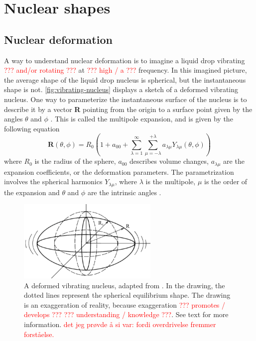 \documentclass[twoside,english]{uiofysmaster/uiofysmaster}
\let\orgautoref\autoref
\renewcommand{\autoref}
        {%
		 \def\sectionautorefname{Section}%
		 \def\subsectionautorefname{Section}%
		 \def\subsubsectionautorefname{Section}%
		 \def\chapterautorefname{Chapter}%
          \orgautoref}
\begin{document}
\section{Nuclear shapes}\label{sec:shapes}

\subsection{Nuclear deformation}
A way to understand nuclear deformation is to imagine a liquid drop vibrating \textcolor{red}{??? and/or rotating ???} at \textcolor{red}{??? high / a ???} frequency. 
In this imagined picture, the average shape of the liquid drop nucleus is spherical, but the instantaneous shape is not.
\autoref{fig:vibrating-nucleus} displays a sketch of a deformed vibrating nucleus.
One way to parameterize the instantaneous surface of the nucleus is to describe it by a vector \textbf{R} pointing from the origin to a surface point given by the angles $\theta$ and $\phi$ \cite{Krane}.
This is called the multipole expansion, and is given by the following equation
\begin{equation}\label{eq:Rfull}
	\mathbf{R}(\theta, \phi) = R_0 \left( 1 + a_{00} + \sum^\infty_{\lambda = 1} \sum^{+\lambda}_{\mu = -\lambda} a_{\lambda \mu} Y_{\lambda \mu}(\theta, \phi) \right)
\end{equation}
where $R_0$ is the radius of the sphere, $a_{00}$ describes volume changes, $a_{\lambda \mu}$ are the expansion coefficients, or the deformation parameters. 
The parametrization involves the spherical harmonics $Y_{\lambda \mu}$, where $\lambda$ is the multipole, $\mu$ is the order of the expansion and $\theta$ and $\phi$ are the intrinsic angles \cite{Krane, RS, Klintefjord}. 

\begin{figure}[ht]
	\centering
	\includegraphics[width=0.6\textwidth]{Images/vibrating-nucleus.png}
	\caption{A deformed vibrating nucleus, adapted from \cite{Krane}. In the drawing, the dotted lines represent the spherical equilibrium shape. The drawing is an exaggeration of reality, because exaggeration \textcolor{red}{??? promotes / develops ???} \textcolor{red}{??? understanding / knowledge ???}. See text for more information. \textcolor{red}{det jeg prøvde å si var: fordi overdrivelse fremmer forståelse.}}
	\label{fig:vibrating-nucleus}
\end{figure}
\end{document}
